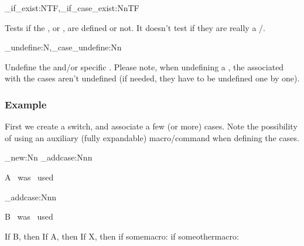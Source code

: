 \documentclass[10pt]{article}
\begin{document}
\begin{codedescribe}[code,new=2025-05-13,EXP]{\switch_if_exist:NTF,\switch_if_case_exist:NnTF}
\begin{codesyntax}%
   
  
\end{codesyntax}
Tests if the , or , are defined or not. It doesn't test if they are really a /.
\end{codedescribe}

\begin{codedescribe}[code,new=2025-05-13]{\switch_undefine:N,\switch_case_undefine:Nn}
\begin{codesyntax}%
 
  
\end{codesyntax}
Undefine the  and/or specific . Please note, when undefining a , the \tsverb[verb]{\csname} associated with the cases aren't undefined (if needed, they have to be undefined one by one).
\end{codedescribe}

\subsubsection{Example}

First we create a switch, and associate a few (or more) cases. Note the possibility of using an auxiliary (fully expandable) macro/command when defining the cases.
\begin{codestore}[switch01]
\ExplSyntaxOn
\def\CaseAstring{case-A}
\switch_new:Nn      
\switch_addcase:Nnn \TextCase  {\CaseAstring} {A~ was~ used\par}
\switch_addcase:Nnn  {B~ was~ used\par}
\ExplSyntaxOff
\end{codestore}

\begin{codestore}[switch01]
\def\somemacro{case-A}
\def\someothermacro{case-X}
If B, then 
If A, then 
If X, then 
if somemacro: \TextCase{\somemacro}
if someothermacro: \TextCase{\someothermacro}

\end{codestore}
\end{document}
